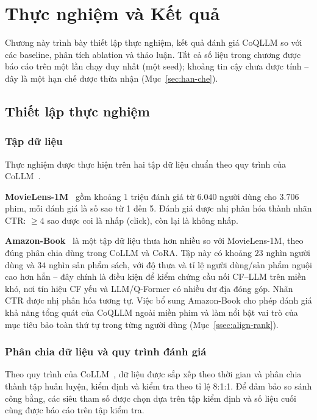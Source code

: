 \chapter{Thực nghiệm và Kết quả}
\label{Chapter4}

Chương này trình bày thiết lập thực nghiệm, kết quả đánh giá CoQLLM so với các baseline,
phân tích ablation và thảo luận. Tất cả số liệu trong chương được báo cáo trên một lần
chạy duy nhất (một seed); khoảng tin cậy chưa được tính -- đây là một hạn chế được thừa
nhận (Mục~\ref{sec:han-che}).

\section{Thiết lập thực nghiệm}
\label{sec:thiet-lap-thuc-nghiem}

\subsection{Tập dữ liệu}
\label{ssec:dataset}

Thực nghiệm được thực hiện trên hai tập dữ liệu chuẩn theo quy trình của
CoLLM~\cite{collm2023}.

\textbf{MovieLens-1M}~\cite{movielens2015} gồm khoảng $1$ triệu đánh giá từ $6{.}040$
người dùng cho $3{.}706$ phim, mỗi đánh giá là số sao từ 1 đến 5. Đánh giá được nhị phân
hóa thành nhãn CTR: $\geq 4$ sao được coi là nhấp (click), còn lại là không nhấp.

\textbf{Amazon-Book}~\cite{cora2024} là một tập dữ liệu thưa hơn nhiều so với MovieLens-1M,
theo đúng phân chia dùng trong CoLLM và CoRA. Tập này có khoảng $23$ nghìn người dùng và
$34$ nghìn sản phẩm sách, với độ thưa và tỉ lệ người dùng/sản phẩm nguội cao hơn hẳn -- đây
chính là điều kiện để kiểm chứng cầu nối CF--LLM trên miền khó, nơi tín hiệu CF yếu và
LLM/Q-Former có nhiều dư địa đóng góp. Nhãn CTR được nhị phân hóa tương tự. Việc bổ sung
Amazon-Book cho phép đánh giá khả năng tổng quát của CoQLLM ngoài miền phim và làm nổi
bật vai trò của mục tiêu bảo toàn thứ tự trong từng người dùng (Mục~\ref{ssec:align-rank}).

\subsection{Phân chia dữ liệu và quy trình đánh giá}
\label{ssec:phan-chia}

Theo quy trình của CoLLM~\cite{collm2023}, dữ liệu được sắp xếp theo thời gian và phân
chia thành tập huấn luyện, kiểm định và kiểm tra theo tỉ lệ 8:1:1. Để đảm bảo so sánh
công bằng, các siêu tham số được chọn dựa trên tập kiểm định và số liệu cuối cùng được
báo cáo trên tập kiểm tra.

